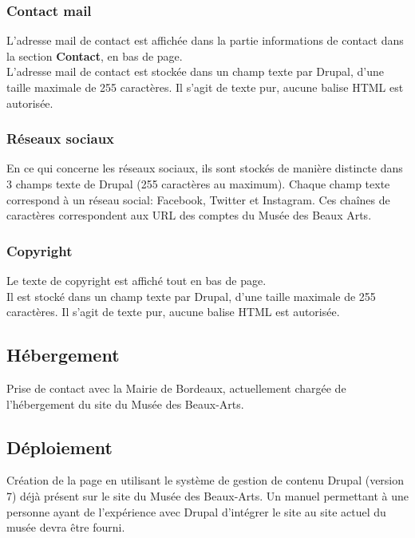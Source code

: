 \documentclass[11pt]{report}
\begin{document}
\subsubsection{Contact mail}

L'adresse mail de contact est affichée dans la partie informations de
contact dans la section \textbf{Contact}, en bas de page. \\
L'adresse mail de contact est stockée dans un champ texte par Drupal, d'une taille
maximale de 255 caractères. Il s'agit de texte pur, aucune balise HTML est autorisée.

\subsubsection{Réseaux sociaux}

En ce qui concerne les réseaux sociaux, ils sont stockés de manière distincte
dans 3 champs texte de Drupal (255 caractères au maximum). Chaque champ texte
correspond à un réseau social: Facebook, Twitter et Instagram. Ces chaînes de
caractères correspondent aux URL des comptes du Musée des Beaux Arts.


\subsubsection{Copyright}

Le texte de copyright est affiché tout en bas de page. \\
Il est stocké dans un champ texte par Drupal, d'une taille maximale de 255
caractères. Il s'agit de texte pur, aucune balise HTML est autorisée.


\subsection*{Hébergement}
Prise de contact avec la Mairie de Bordeaux, actuellement chargée de
l'hébergement du site du Musée des Beaux-Arts.

\subsection*{Déploiement}
Création de la page en utilisant le système de gestion de contenu Drupal
(version 7) déjà présent sur le site du Musée des Beaux-Arts.
Un manuel permettant à une personne ayant de l'expérience avec Drupal
d'intégrer le site au site actuel du musée devra être fourni.
\end{document}
